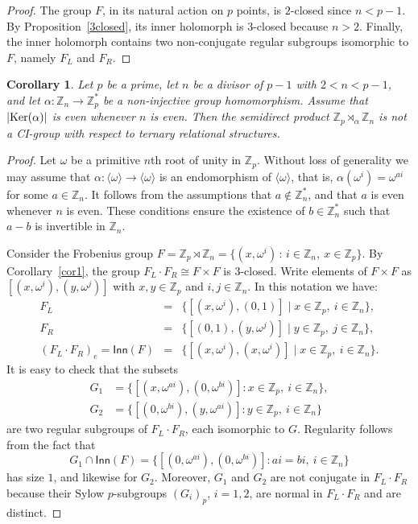 \documentclass[11pt]{amsart}
\numberwithin{equation}{section}
\newtheorem{cor}[thrm]{Corollary}
\theoremstyle{definition}
\def\Ker{{\rm Ker}}
\def\Z{{\mathbb Z}}
\begin{document}
	\begin{proof} The group $F$, in its natural action on $p$ points, is $2$-closed since $n < p-1$.  
		By Proposition~\ref{3closed}, its inner holomorph is $3$-closed because $n > 2$.  
		Finally, the inner holomorph contains two non-conjugate regular subgroups isomorphic to $F$, namely $F_L$ and $F_R$.
	\end{proof}
	
	\begin{cor}\label{cor2}Let $p$ be a prime,  let $n$ be a divisor of $p-1$ with $2 < n < p-1$, and let $\alpha\colon \Z_n\rightarrow \Z_p^*$ be a non-injective group homomorphism. Assume that $|\Ker(\alpha)|$ is even whenever $n$ is even.  Then the semidirect product $\Z_p\rtimes_\alpha\Z_n$ is not a CI-group with respect to ternary relational structures.
	\end{cor}
	
	\begin{proof}Let $\omega$ be a primitive $n$th root of unity in $\Z_p$.  
		Without loss of generality we may assume that 
		$\alpha\colon \langle \omega \rangle \rightarrow \langle \omega \rangle$ 
		is an endomorphism of $\langle \omega \rangle$, that is, 
		$\alpha(\omega^i)=\omega^{ai}$ for some $a\in \Z_n$.  
		It follows from the assumptions that $a\notin \Z_n^*$, and that $a$ is even whenever $n$ is even.  
		These conditions ensure the existence of $b\in \Z_n^*$ such that $a-b$ is invertible in $\Z_n$.
		
		Consider the Frobenius group 
		$F=\Z_p\rtimes \Z_n = \{(x,\omega^i)\,:\,i\in\Z_n,\ x\in\Z_p\}$.  
		By Corollary~\ref{cor1}, the group $F_L\cdot F_R\cong F\times F$ is $3$-closed.  
		Write elements of $F\times F$ as $[(x,\omega^i),(y,\omega^j)]$ with $x,y\in\Z_p$ and $i,j\in\Z_n$.  
		In this notation we have:
		$$
		\begin{array}{rcl}
			F_L & = & \{[(x,\omega^i),(0,1)] \mid x\in \Z_p,\ i\in\Z_n\},\\ 
			F_R & = & \{[(0,1),(y,\omega^j)] \mid y\in \Z_p,\ j\in\Z_n\},\\
			(F_L\cdot F_R)_e = \mathsf{Inn}(F) 
			& = & 
			\{[(x,\omega^i),(x,\omega^i)] \mid x\in \Z_p,\ i\in\Z_n\}.
		\end{array}
		$$
		It is easy to check that the subsets
		\begin{align*}
			G_1 &= \{[(x,\omega^{ai}),(0,\omega^{bi})] : x\in\Z_p,\ i\in\Z_n\},\\
			G_2 &= \{[(0,\omega^{bi}),(y,\omega^{ai})] : y\in\Z_p,\ i\in\Z_n\}
		\end{align*}
		are two regular subgroups of $F_L\cdot F_R$, each isomorphic to $G$.  
		Regularity follows from the fact that 
		\[
		G_1 \cap \mathsf{Inn}(F)
		= \{[(0,\omega^{ai}),(0,\omega^{bi})] : ai = bi,\ i\in\Z_n\}
		\]
		has size $1$, and likewise for $G_2$.  
		Moreover, $G_1$ and $G_2$ are not conjugate in $F_L\cdot F_R$ because their Sylow $p$-subgroups $(G_i)_p$, $i=1,2$, are normal in $F_L\cdot F_R$ and are distinct.
	\end{proof}
	
\end{document}
